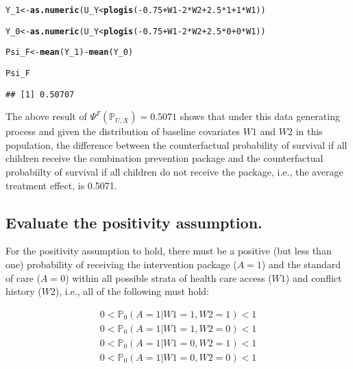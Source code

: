 \documentclass{article}\usepackage[]{graphicx}\usepackage[]{xcolor}
\makeatletter
\newcommand{\hlnum}[1]{\textcolor[rgb]{0.686,0.059,0.569}{#1}}%
\newcommand{\hlopt}[1]{\textcolor[rgb]{0,0,0}{#1}}%
\newcommand{\hlstd}[1]{\textcolor[rgb]{0.345,0.345,0.345}{#1}}%
\newcommand{\hlkwb}[1]{\textcolor[rgb]{0.69,0.353,0.396}{#1}}%
\newcommand{\hlkwd}[1]{\textcolor[rgb]{0.737,0.353,0.396}{\textbf{#1}}}%
\newenvironment{kframe}{%
 \def\at@end@of@kframe{}%
 \ifinner\ifhmode%
  \def\at@end@of@kframe{\end{minipage}}%
  \begin{minipage}{\columnwidth}%
 \fi\fi%
 \def\FrameCommand##1{\hskip\@totalleftmargin \hskip-\fboxsep
 \colorbox{shadecolor}{##1}\hskip-\fboxsep
     \hskip-\linewidth \hskip-\@totalleftmargin \hskip\columnwidth}%
 \MakeFramed {\advance\hsize-\width
   \@totalleftmargin\z@ \linewidth\hsize
   \@setminipage}}%
 {\par\unskip\endMakeFramed%
 \at@end@of@kframe}
\newenvironment{knitrout}{}{} %
\makeatother
\begin{document}
\begin{knitrout}
\color{fgcolor}\begin{kframe}
\begin{alltt}
\hlstd{Y_1} \hlkwb{<-} \hlkwd{as.numeric}\hlstd{(U_Y} \hlopt{<} \hlkwd{plogis}\hlstd{(}\hlopt{-}\hlnum{0.75}\hlopt{+}\hlstd{W1}\hlopt{-}\hlnum{2}\hlopt{*}\hlstd{W2}\hlopt{+}\hlnum{2.5}\hlopt{*}\hlnum{1}\hlopt{+}\hlnum{1}\hlopt{*}\hlstd{W1))}

\hlstd{Y_0} \hlkwb{<-} \hlkwd{as.numeric}\hlstd{(U_Y} \hlopt{<} \hlkwd{plogis}\hlstd{(}\hlopt{-}\hlnum{0.75}\hlopt{+}\hlstd{W1}\hlopt{-}\hlnum{2}\hlopt{*}\hlstd{W2}\hlopt{+}\hlnum{2.5}\hlopt{*}\hlnum{0}\hlopt{+}\hlnum{0}\hlopt{*}\hlstd{W1))}

\hlstd{Psi_F} \hlkwb{<-} \hlkwd{mean}\hlstd{(Y_1)} \hlopt{-} \hlkwd{mean}\hlstd{(Y_0)}

\hlstd{Psi_F}
\end{alltt}
\begin{verbatim}
## [1] 0.50707
\end{verbatim}
\end{kframe}
\end{knitrout}
 
The above result of $\Psi^F(\mathbb{P}_{U,X}) = 0.5071$ shows that under this data generating process and given the distribution of baseline covariates $W1$ and $W2$ in this population, the difference between the counterfactual probability of survival if all children receive the combination prevention package and the counterfactual probabiilty of survival if all children do not receive the package, i.e., the average treatment effect, is 0.5071.
  
  \subsection{Evaluate the positivity assumption.}
  
For the positivity assumption to hold, there must be a positive (but less than one) probability of receiving the intervention package ($A = 1$) and the standard of care ($A = 0$) within all possible strata of health care access ($W1$) and conflict history ($W2$), i.e., all of the following must hold:

\begin{align*}
0<\mathbb{P}_0(A=1|W1=1,W2=1)<1 \\
0<\mathbb{P}_0(A=1|W1=1,W2=0)<1 \\
0<\mathbb{P}_0(A=1|W1=0,W2=1)<1 \\
0<\mathbb{P}_0(A=1|W1=0,W2=0)<1
\end{align*}
\end{document}
